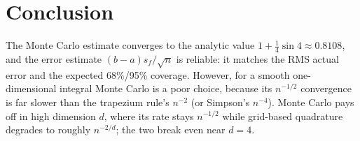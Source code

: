 \documentclass[10pt,a4paper]{article}
\begin{document}
\section{Conclusion}
The Monte Carlo estimate converges to the analytic value $1+\tfrac14\sin4\approx0.8108$, and the error estimate $(b-a)s_f/\sqrt n$ is reliable: it matches the RMS actual error and the expected 68\%/95\% coverage. However, for a smooth one-dimensional integral Monte Carlo is a poor choice, because its $n^{-1/2}$ convergence is far slower than the trapezium rule's $n^{-2}$ (or Simpson's $n^{-4}$). Monte Carlo pays off in high dimension $d$, where its rate stays $n^{-1/2}$ while grid-based quadrature degrades to roughly $n^{-2/d}$; the two break even near $d=4$.
\end{document}
